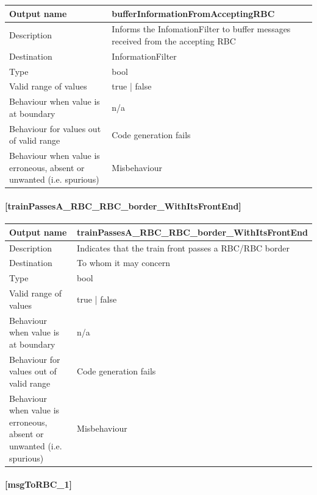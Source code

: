 \begin{longtable}{p{}p{}}
	\toprule
	Output name				& bufferInformationFromAcceptingRBC \\
	\midrule
	Description				& Informs the InfomationFilter to buffer messages received from the accepting RBC \\
	\midrule
	Destination				& InformationFilter \\ 
	\midrule
	Type					& bool \\
	\midrule
	Valid range of values	& true | false \\
	\midrule
	Behaviour when value is at boundary	& n/a \\
	\midrule
	Behaviour for values out of valid range	& Code generation fails \\
	\midrule
	Behaviour when value is erroneous, absent or unwanted (i.e. spurious) & Misbehaviour \\
	\bottomrule
\end{longtable}

\paragraph{[trainPassesA\_RBC\_RBC\_border\_WithItsFrontEnd]}

\begin{longtable}{p{}p{}}
	\toprule
	Output name				& trainPassesA\_RBC\_RBC\_border\_WithItsFrontEnd \\
	\midrule
	Description				& Indicates that the train front passes a RBC/RBC border \\
	\midrule
	Destination				& To whom it may concern \\ 
	\midrule
	Type					& bool \\
	\midrule
	Valid range of values	& true | false \\
	\midrule
	Behaviour when value is at boundary	& n/a \\
	\midrule
	Behaviour for values out of valid range	& Code generation fails \\
	\midrule
	Behaviour when value is erroneous, absent or unwanted (i.e. spurious) & Misbehaviour \\
	\bottomrule
\end{longtable}

\paragraph{[msgToRBC\_1]}

